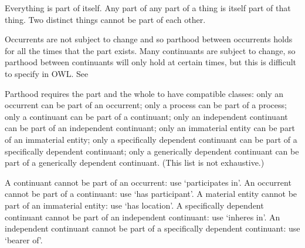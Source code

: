 \documentclass[letterpaper,10pt,english]{sphinxmanual}
\begin{document}
\begin{sphinxShadowBox}

\sphinxAtStartPar
Everything is part of itself. Any part of any part of a thing is itself part of that thing. Two distinct things cannot be part of each other.

\sphinxAtStartPar
Occurrents are not subject to change and so parthood between occurrents holds for all the times that the part exists. Many continuants are subject to change, so parthood between continuants will only hold at certain times, but this is difficult to specify in OWL. See 

\sphinxAtStartPar
Parthood requires the part and the whole to have compatible classes: only an occurrent can be part of an occurrent; only a process can be part of a process; only a continuant can be part of a continuant; only an independent continuant can be part of an independent continuant; only an immaterial entity can be part of an immaterial entity; only a specifically dependent continuant can be part of a specifically dependent continuant; only a generically dependent continuant can be part of a generically dependent continuant. (This list is not exhaustive.)

\sphinxAtStartPar
A continuant cannot be part of an occurrent: use ‘participates in’. An occurrent cannot be part of a continuant: use ‘has participant’. A material entity cannot be part of an immaterial entity: use ‘has location’. A specifically dependent continuant cannot be part of an independent continuant: use ‘inheres in’. An independent continuant cannot be part of a specifically dependent continuant: use ‘bearer of’.
\end{sphinxShadowBox}

\begin{sphinxShadowBox}

\sphinxAtStartPar
{}
\end{sphinxShadowBox}

\begin{sphinxShadowBox}

\sphinxAtStartPar
{}

\sphinxAtStartPar
{}

\sphinxAtStartPar
{}
\end{sphinxShadowBox}
\begin{quote}
\label{\detokenize{doc-BFO_0000051:bfo-0000051}}\label{\detokenize{doc-BFO_0000051:has-part}}\label{\detokenize{doc-BFO_0000051:bfo-0000051}}
\ignorespaces \end{quote}
\end{document}
